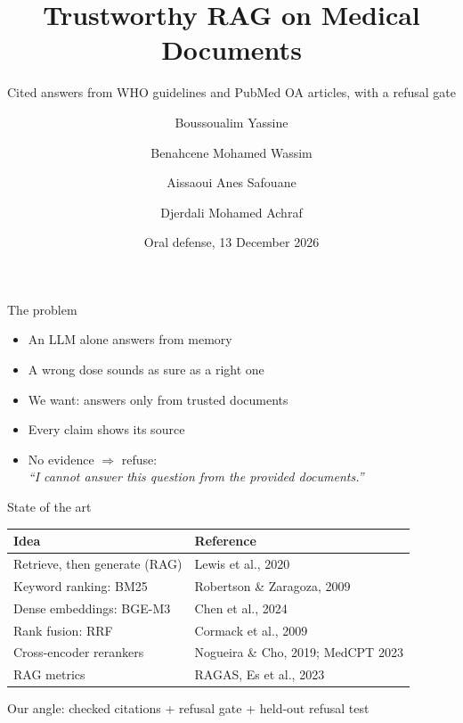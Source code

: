 \documentclass[12pt,aspectratio=169]{beamer}
\title{Trustworthy RAG on Medical Documents}
\subtitle{Cited answers from WHO guidelines and PubMed OA articles, with a refusal gate}
\author{Boussoualim Yassine \and Benahcene Mohamed Wassim \and Aissaoui Anes Safouane \and Djerdali Mohamed Achraf}
\institute{LLM Final Projects 2026--2027, Prof.\ A.\ Moussaoui, Project 2\\
  Group \TODO{group number} \quad \TODO{school}}
\date{Oral defense, 13 December 2026}
\begin{document}
\begin{frame}
  \titlepage
\end{frame}

\begin{frame}{The problem}
  \begin{itemize}
    \item An LLM alone answers from memory
    \item A wrong dose sounds as sure as a right one
    \item We want: answers \alert{only} from trusted documents
    \item Every claim shows its source
    \item No evidence $\Rightarrow$ refuse:\\
      \emph{``I cannot answer this question from the provided documents.''}
  \end{itemize}
\end{frame}

\begin{frame}{State of the art}
  \small
  \begin{tabular}{@{}ll@{}}
    \toprule
    Idea & Reference \\
    \midrule
    Retrieve, then generate (RAG) & Lewis et al., 2020 \\
    Keyword ranking: BM25 & Robertson \& Zaragoza, 2009 \\
    Dense embeddings: BGE-M3 & Chen et al., 2024 \\
    Rank fusion: RRF & Cormack et al., 2009 \\
    Cross-encoder rerankers & Nogueira \& Cho, 2019; MedCPT 2023 \\
    RAG metrics & RAGAS, Es et al., 2023 \\
    \bottomrule
  \end{tabular}
  \bigskip

  \normalsize Our angle: \alert{checked citations} + \alert{refusal gate} + held-out refusal test
\end{frame}
\end{document}
